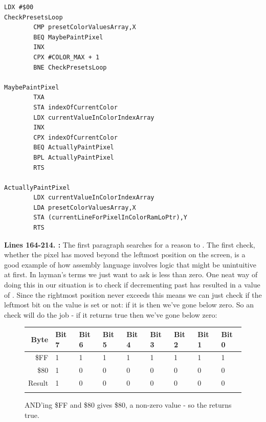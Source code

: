 {\begin{lstlisting}[caption=Where the painting is actually done.]
        LDX #$00
CheckPresetsLoop   
        CMP presetColorValuesArray,X
        BEQ MaybePaintPixel
        INX 
        CPX #COLOR_MAX + 1
        BNE CheckPresetsLoop

MaybePaintPixel   
        TXA 
        STA indexOfCurrentColor
        LDX currentValueInColorIndexArray
        INX 
        CPX indexOfCurrentColor
        BEQ ActuallyPaintPixel
        BPL ActuallyPaintPixel
        RTS 

ActuallyPaintPixel   
        LDX currentValueInColorIndexArray
        LDA presetColorValuesArray,X
        STA (currentLineForPixelInColorRamLoPtr),Y
        RTS 
\end{lstlisting}
\clearpage

\textbf{Lines 164-214. :} The first paragraph searches for a reason to . The first
check, whether the pixel has moved beyond the leftmost position on the screen, is a good example of how assembly language involves
logic that might be unintuitive at first. In layman's terms we just want to ask is  less than zero. One neat
way of doing this in our situation is to check if decrementing past  has resulted in a value of . Since
the rightmost position never exceeds  this means we can just check if the leftmost bit on the value is set or not: if 
it is then we've gone below zero. So an  check will do the job - if it returns true then we've gone below zero:

\begin{figure}[H]
  {
    \setlength{\tabcolsep}{3.0pt}
    \setlength\cmidrulewidth{\heavyrulewidth} %
    \begin{adjustbox}{width=7cm,center}

      \begin{tabular}{rllllllll}
        \toprule
        Byte & Bit 7 & Bit 6 & Bit 5 & Bit 4 & Bit 3 & Bit 2 & Bit 1 & Bit 0        \\
        \midrule
        \$FF & 1 & 1 & 1 & 1 & 1 & 1 & 1 & 1 \\
        \$80 & 1 & 0 & 0 & 0 & 0 & 0 & 0 & 0 \\
        \midrule
        Result & 1 & 0 & 0 & 0 & 0 & 0 & 0 & 0 \\
        \addlinespace
        \bottomrule
      \end{tabular}
    \end{adjustbox}
    }\caption*{AND'ing \$FF and \$80 gives \$80, a non-zero value - so the  returns true.}
\end{figure}

}
